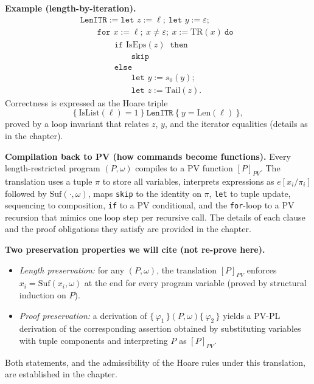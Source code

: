 \medskip
\noindent\textbf{Example (length-by-iteration).}
\[
\begin{array}{l}
\texttt{LenITR} := \texttt{let } z := \ell;\ \texttt{let } y := \varepsilon; \\[0.2em]
\qquad \texttt{for } x := \ell;\ x \neq \varepsilon;\ x := \mathrm{TR}(x)\ \texttt{do } \\
\qquad\qquad \texttt{if } \mathrm{IsEps}(z)\ \texttt{ then } \\[0.2em]
\qquad\qquad\qquad \texttt{skip} \\[0.2em]
\qquad\qquad \texttt{else } \\[0.2em]
\qquad\qquad\qquad \texttt{let } y := s_0(y); \\[0.2em]
\qquad\qquad\qquad \texttt{let } z := \mathrm{Tail}(z).
\end{array}
\]
Correctness is expressed as the Hoare triple
\[
\{\ \mathrm{IsList}(\ell)=1\ \}\ \texttt{LenITR}\ \{\ y = \mathrm{Len}(\ell)\ \},
\]
proved by a loop invariant that relates \(z\), \(y\), and the iterator equalities (details as in the chapter).


\medskip
\noindent\textbf{Compilation back to PV (how commands become functions).}
Every length-restricted program \((P,\omega)\) compiles to a PV function \(\ensuremath{[P]_{PV}}\).
The translation uses a tuple \(\pi\) to store all variables, interprets expressions as \(e[x_i/\pi_i]\) followed by \(\mathrm{Suf}(\cdot,\omega)\), maps \texttt{skip} to the identity on \(\pi\), \texttt{let} to tuple update, sequencing to composition, \texttt{if} to a PV conditional, and the \texttt{for}-loop to a PV recursion that mimics one loop step per recursive call.
The details of each clause and the proof obligations they satisfy are provided in the chapter.

\medskip
\noindent\textbf{Two preservation properties we will cite (not re-prove here).}
\begin{itemize}
  \item \emph{Length preservation:} for any \((P,\omega)\), the translation \(\ensuremath{[P]_{PV}}\) enforces \(x_i=\mathrm{Suf}(x_i,\omega)\) at the end for every program variable (proved by structural induction on \(P\)).
  \item \emph{Proof preservation:} a derivation of \(\{\,\varphi_1\,\}(P,\omega)\{\,\varphi_2\,\}\) yields a PV-PL derivation of the corresponding assertion obtained by substituting variables with tuple components and interpreting \(P\) as \(\ensuremath{[P]_{PV}}\).
\end{itemize}
Both statements, and the admissibility of the Hoare rules under this translation, are established in the chapter.

